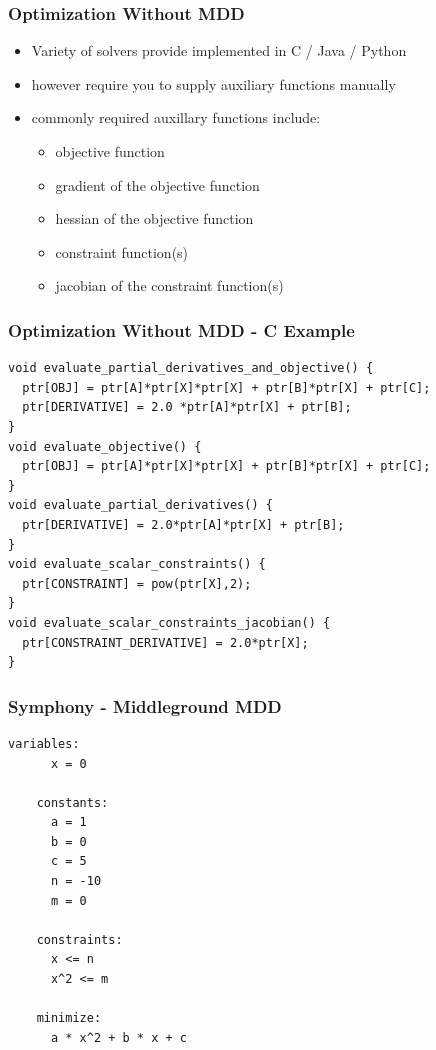 \documentclass[presentation]{beamer}
\begin{document}
\begin{frame}
  \frametitle{Optimization Without MDD}

  \begin{itemize}
  \item Variety of solvers provide implemented in C / Java / Python
  \item however require you to supply auxiliary functions manually
  \item commonly required auxillary functions include:
    \begin{itemize}
    \item objective function
    \item gradient of the objective function
    \item hessian of the objective function
    \item constraint function(s)
    \item jacobian of the constraint function(s)
    \end{itemize}
  \end{itemize}
\end{frame}

\begin{frame}[fragile]
  \frametitle{Optimization Without MDD - C Example}

\begin{lstlisting}[style=CStyle]
void evaluate_partial_derivatives_and_objective() {
  ptr[OBJ] = ptr[A]*ptr[X]*ptr[X] + ptr[B]*ptr[X] + ptr[C];
  ptr[DERIVATIVE] = 2.0 *ptr[A]*ptr[X] + ptr[B];
}
void evaluate_objective() {
  ptr[OBJ] = ptr[A]*ptr[X]*ptr[X] + ptr[B]*ptr[X] + ptr[C];
}
void evaluate_partial_derivatives() {
  ptr[DERIVATIVE] = 2.0*ptr[A]*ptr[X] + ptr[B];
}
void evaluate_scalar_constraints() {
  ptr[CONSTRAINT] = pow(ptr[X],2);
}
void evaluate_scalar_constraints_jacobian() {
  ptr[CONSTRAINT_DERIVATIVE] = 2.0*ptr[X];
}
\end{lstlisting}
\end{frame}

\begin{frame}[fragile]
  \frametitle{Symphony - Middleground MDD}
  \begin{lstlisting}[style=CStyle]
    variables:
      x = 0

    constants:
      a = 1
      b = 0
      c = 5
      n = -10
      m = 0

    constraints:
      x <= n
      x^2 <= m

    minimize:
      a * x^2 + b * x + c   
  \end{lstlisting}
\end{frame}
\end{document}
